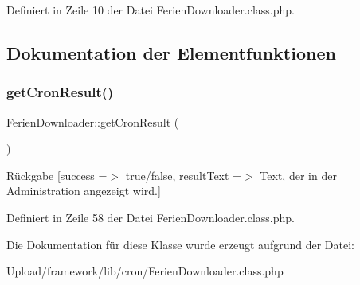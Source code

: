 Definiert in Zeile 10 der Datei Ferien\+Downloader.\+class.\+php.



\subsection{Dokumentation der Elementfunktionen}
\mbox{\label{class_ferien_downloader_a9ca46e8feeebeb1ad9b0a77da03ca0a1}} 
\subsubsection{\texorpdfstring{get\+Cron\+Result()}{getCronResult()}}
{\footnotesize\ttfamily Ferien\+Downloader\+::get\+Cron\+Result (\begin{DoxyParamCaption}{ }\end{DoxyParamCaption})}

\begin{DoxyReturn}{Rückgabe}
\mbox{[}\textquotesingle{}success\textquotesingle{} =$>$ \textquotesingle{}true/false\textquotesingle{}, \textquotesingle{}result\+Text\textquotesingle{} =$>$ \textquotesingle{}Text, der in der Administration angezeigt wird.\textquotesingle{}\mbox{]} 
\end{DoxyReturn}


Definiert in Zeile 58 der Datei Ferien\+Downloader.\+class.\+php.



Die Dokumentation für diese Klasse wurde erzeugt aufgrund der Datei\+:\begin{DoxyCompactItemize}
\item 
Upload/framework/lib/cron/Ferien\+Downloader.\+class.\+php\end{DoxyCompactItemize}
